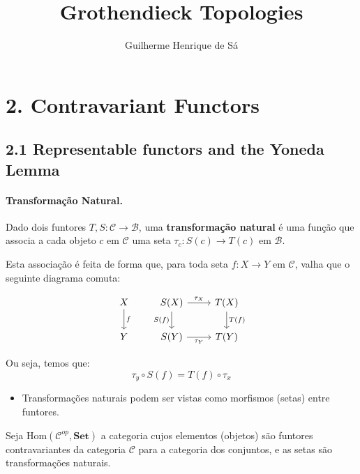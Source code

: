 \documentclass{article}
\title{Grothendieck Topologies}
\author{Guilherme Henrique de Sá}
\date{}
\theoremstyle{plain}                    %
\theoremstyle{definition}
\theoremstyle{remark}
\begin{document}
\maketitle

\section*{2. Contravariant Functors}
\subsection*{2.1 Representable functors and the Yoneda Lemma}

\paragraph{Transformação Natural.}
Dado dois funtores $T, S : \mathcal{C} \to \mathcal{B}$, uma \textbf{transformação natural} é uma função que associa a cada objeto $c$ em $\mathcal{C}$ uma seta $\tau_c : S(c) \to T(c)$ em $\mathcal{B}$.

Esta associação é feita de forma que, para toda seta $f : X \to Y$ em $\mathcal{C}$, valha que o seguinte diagrama comuta:

\[
\begin{tikzcd}
    X \arrow[d, "f"] & S(X) \arrow[r, "\tau_X"] \arrow[d, "S(f)"'] & T(X) \arrow[d, "T(f)"] \\
    Y & S(Y) \arrow[r, "\tau_Y"'] & T(Y)
\end{tikzcd}
\]

Ou seja, temos que: 
\[
\tau_y \circ S(f) = T(f) \circ \tau_x
\]

\begin{itemize}
    \item Transformações naturais podem ser vistas como morfismos (setas) entre funtores.
\end{itemize}

Seja $\text{Hom}(\mathcal{C}^{op}, \mathbf{Set})$ a categoria cujos elementos (objetos) são funtores contravariantes da categoria $\mathcal{C}$ para a categoria dos conjuntos, e as setas são transformações naturais.
\end{document}
